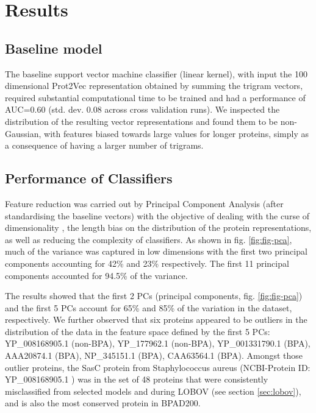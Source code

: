 \documentclass[10pt,journal,compsoc,twoside]{IEEEtran}
\begin{document}
\section{Results}
\label{sec:Results}

\subsection{Baseline model}
\label{sec:baseline}
The baseline support vector machine classifier (linear kernel), with input the 100 dimensional Prot2Vec representation obtained by summing the trigram vectors, required substantial computational time to be trained and had a performance of AUC=0.60 (std. dev. 0.08 across cross validation runs). We inspected the distribution of the resulting vector representations and found them to be non-Gaussian, with features biased towards large values for longer proteins, simply as a consequence of having a larger number of trigrams.


\subsection{Performance of Classifiers}
\label{sec:pca-hc}

Feature reduction was carried out by Principal Component Analysis (after standardising the baseline vectors)  with the objective of dealing with the curse of dimensionality \cite{dynamic_programming}, the length bias on the distribution of the protein representations, as well as reducing the complexity of classifiers. As shown in fig. \ref{fig:fig-pca}, much of the variance was captured in low dimensions with the first two principal components accounting for 42\% and 23\% respectively. The first 11 principal components accounted for 94.5\% of the variance. 

The results showed that the first 2 PCs (principal components, fig. \ref{fig:fig-pca}) and the first 5 PCs account for 65\% and 85\% of the variation in the dataset, respectively. We further observed that six proteins appeared to be outliers in the distribution of the data in the feature space defined by the first 5 PCs: YP\_008168905.1 (non-BPA), YP\_177962.1 (non-BPA), YP\_001331790.1 (BPA), AAA20874.1 (BPA), NP\_345151.1 (BPA), CAA63564.1 (BPA). Amongst those outlier proteins, the SasC protein from Staphylococcus aureus (NCBI-Protein ID: YP\_008168905.1 \cite{YP_008168905.1}) was in the set of 48 proteins that were consistently misclassified from selected models and during LOBOV (see section  \ref{sec:lobov}), and is also the most conserved protein in BPAD200.
\end{document}
